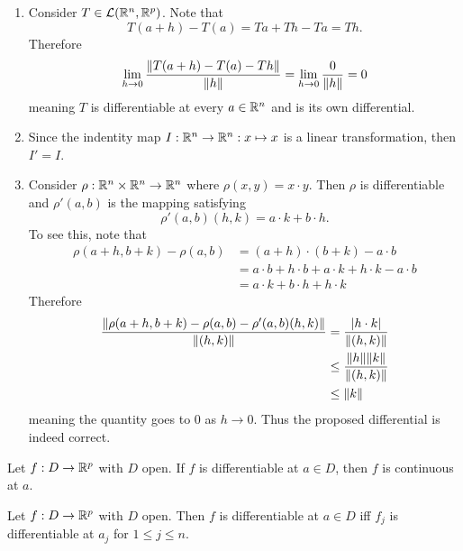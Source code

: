 \documentclass[../main.tex]{subfiles}
\begin{document}
\begin{example}
    \hfill
    \begin{enumerate}
        \item Consider $T \in \mathcal{L}(\mathbb{R}^n, \mathbb{R}^p)$. Note that
            \[
                T(a + h) - T(a) = Ta + Th - Ta = Th
            .\]
            Therefore
            \[
                \lim_{h \to 0} \frac{\norm{T(a+h) - T(a) - Th}}{\norm{h}} = \lim_{h \to 0} \frac{0}{\norm{h}} = 0
            \]
            meaning $T$ is differentiable at every $a \in \mathbb{R}^n$ and is its own differential.
        \item Since the indentity map $I : \mathbb{R}^n \to \mathbb{R}^n : x \mapsto x$ is a linear transformation, then $I' = I$.
        \item Consider $\rho : \mathbb{R}^n \times \mathbb{R}^n \to \mathbb{R}^n$ where $\rho(x,y) = x \cdot y$. Then $\rho$ is differentiable and $\rho'(a,b)$ is the mapping satisfying
            \[
                \rho'(a,b) (h,k) = a \cdot k + b \cdot h
            .\]
            To see this, note that
            \begin{align*}
                \rho(a+h, b+k) - \rho(a,b) &= (a+h) \cdot (b+k) - a \cdot b \\
                &= a \cdot b + h \cdot b + a \cdot k + h \cdot k - a \cdot b \\
                &= a \cdot k + b \cdot h + h \cdot k
            \end{align*}
            Therefore
            \begin{align*}
                \frac{\norm{\rho(a+h, b+k) - \rho(a,b) - \rho'(a,b)(h,k)}}{\norm{(h,k)}} &= \frac{|h \cdot k|}{\norm{(h,k)}} \\
                &\leq \frac{\norm{h} \norm{k}}{\norm{(h,k)}} \\
                &\leq \norm{k}
            \end{align*}
            meaning the quantity goes to $0$ as $h \to 0$. Thus the proposed differential is indeed correct.
    \end{enumerate}
\end{example}

\begin{theorem}
    Let $f : D \to \mathbb{R}^p$ with $D$ open. If $f$ is differentiable at $a \in D$, then $f$ is continuous at $a$.
\end{theorem}

\begin{theorem}
    Let $f : D \to \mathbb{R}^p$ with $D$ open. Then $f$ is differentiable at $a \in D$ iff $f_j$ is differentiable at $a_j$ for $1 \leq j \leq n$.
\end{theorem}
\end{document}
